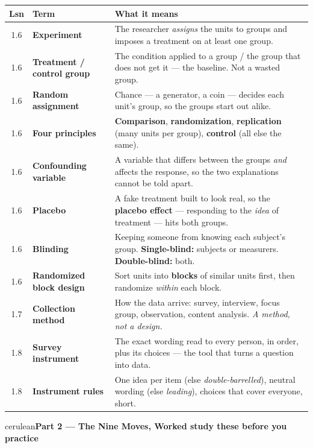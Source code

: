 \documentclass[10pt]{article}
\newcommand{\parthead}[1]{%
  \vspace{6pt}\noindent
  \begin{headlinebox}{cerulean}{\color{white}\bfseries #1}\end{headlinebox}%
  \vspace{4pt}}
\begin{document}
\vspace{4pt}
\boxguard[16]
\begin{tabularx}{\linewidth}{@{} c >{\raggedright\arraybackslash\bfseries}p{3.5cm} X @{}}
\rowcolor{frost}
\textbf{Lsn} & \textbf{Term} & \textbf{What it means} \\
\midrule
1.6 & Experiment & The researcher \emph{assigns} the units to groups and imposes a
      treatment on at least one group. \\
1.6 & Treatment / control group & The condition applied to a group / the group that
      does not get it --- the baseline. Not a wasted group. \\
1.6 & Random assignment & Chance --- a generator, a coin --- decides each unit's
      group, so the groups start out alike. \\
1.6 & Four principles & \textbf{Comparison}, \textbf{randomization},
      \textbf{replication} (many units per group), \textbf{control} (all else the same). \\
1.6 & Confounding variable & A variable that differs between the groups \emph{and}
      affects the response, so the two explanations cannot be told apart. \\
1.6 & Placebo & A fake treatment built to look real, so the \textbf{placebo effect}
      --- responding to the \emph{idea} of treatment --- hits both groups. \\
1.6 & Blinding & Keeping someone from knowing each subject's group.
      \textbf{Single-blind:} subjects or measurers. \textbf{Double-blind:} both. \\
1.6 & Randomized block design & Sort units into \textbf{blocks} of similar units first,
      then randomize \emph{within} each block. \\
1.7 & Collection method & How the data arrive: survey, interview, focus group,
      observation, content analysis. \emph{A method, not a design.} \\
1.8 & Survey instrument & The exact wording read to every person, in order, plus
      its choices --- the tool that turns a question into data. \\
1.8 & Instrument rules & One idea per item (else \emph{double-barrelled}), neutral
      wording (else \emph{leading}), choices that cover everyone, short. \\
\end{tabularx}
\normalsize

\vspace{4pt}
\boxguard[22]
\parthead{Part 2 --- The Nine Moves, Worked \hfill study these before you practice}
\end{document}
